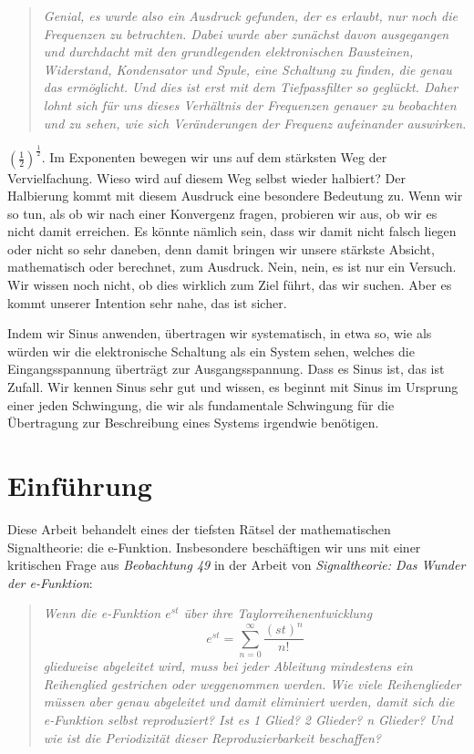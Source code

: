 \documentclass[a4paper,12pt,twoside]{report}
\theoremstyle{definition}
\begin{document}
\begin{quote}
\textit{Genial, es wurde also ein Ausdruck gefunden, der es erlaubt, nur noch die Frequenzen zu betrachten. Dabei wurde aber zunächst davon ausgegangen und durchdacht mit den grundlegenden elektronischen Bausteinen, Widerstand, Kondensator und Spule, eine Schaltung zu finden, die genau das ermöglicht. Und dies ist erst mit dem Tiefpassfilter so geglückt. Daher lohnt sich für uns dieses Verhältnis der Frequenzen genauer zu beobachten und zu sehen, wie sich Veränderungen der Frequenz aufeinander auswirken.}
\end{quote}

$(\frac{1}{2})^{\frac{1}{2}}$. Im Exponenten bewegen wir uns auf dem stärksten Weg der Vervielfachung. Wieso wird auf diesem Weg selbst wieder halbiert? Der Halbierung kommt mit diesem Ausdruck eine besondere Bedeutung zu. Wenn wir so tun, als ob wir nach einer Konvergenz fragen, probieren wir aus, ob wir es nicht damit erreichen. Es könnte nämlich sein, dass wir damit nicht falsch liegen oder nicht so sehr daneben, denn damit bringen wir unsere stärkste Absicht, mathematisch oder berechnet, zum Ausdruck. Nein, nein, es ist nur ein Versuch. Wir wissen noch nicht, ob dies wirklich zum Ziel führt, das wir suchen. Aber es kommt unserer Intention sehr nahe, das ist sicher.

Indem wir Sinus anwenden, übertragen wir systematisch, in etwa so, wie als würden wir die elektronische Schaltung als ein System sehen, welches die Eingangsspannung überträgt zur Ausgangsspannung. Dass es Sinus ist, das ist Zufall. Wir kennen Sinus sehr gut und wissen, es beginnt mit Sinus im Ursprung einer jeden Schwingung, die wir als fundamentale Schwingung für die Übertragung zur Beschreibung eines Systems irgendwie benötigen.

\section{Einführung}
Diese Arbeit behandelt eines der tiefsten Rätsel der mathematischen Signaltheorie: die e-Funktion. Insbesondere beschäftigen wir uns mit einer kritischen Frage aus \textit{Beobachtung 49} in der Arbeit von \cite{epp_signal} \textit{Signaltheorie: Das Wunder der e-Funktion}:

\begin{quote}
	\textit{Wenn die e-Funktion $e^{st}$ über ihre Taylorreihenentwicklung 
	$$e^{st} = \sum_{n=0}^{\infty} \frac{(st)^n}{n!}$$
	gliedweise abgeleitet wird, muss bei jeder Ableitung mindestens ein Reihenglied gestrichen oder weggenommen werden. Wie viele Reihenglieder müssen aber genau abgeleitet und damit eliminiert werden, damit sich die e-Funktion selbst reproduziert? Ist es 1 Glied? 2 Glieder? n Glieder? Und wie ist die Periodizität dieser Reproduzierbarkeit beschaffen?}
\end{quote}
\end{document}
